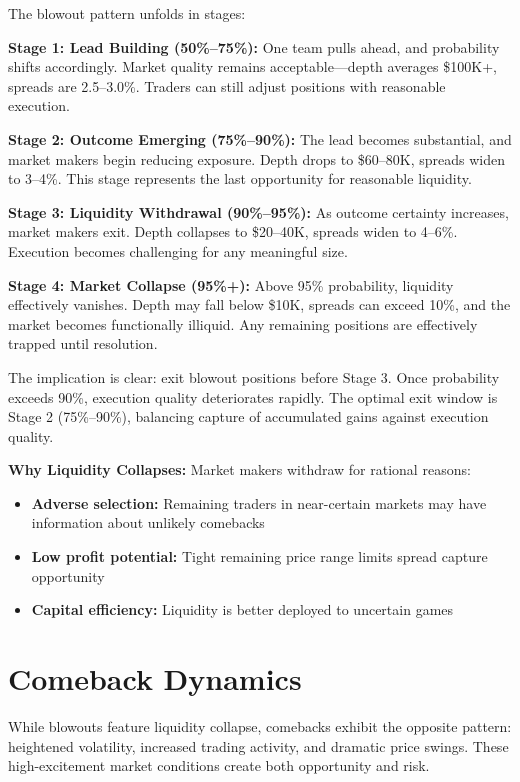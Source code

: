 The blowout pattern unfolds in stages:

\textbf{Stage 1: Lead Building (50\%--75\%):} One team pulls ahead, and probability shifts accordingly. Market quality remains acceptable---depth averages \$100K+, spreads are 2.5--3.0\%. Traders can still adjust positions with reasonable execution.

\textbf{Stage 2: Outcome Emerging (75\%--90\%):} The lead becomes substantial, and market makers begin reducing exposure. Depth drops to \$60--80K, spreads widen to 3--4\%. This stage represents the last opportunity for reasonable liquidity.

\textbf{Stage 3: Liquidity Withdrawal (90\%--95\%):} As outcome certainty increases, market makers exit. Depth collapses to \$20--40K, spreads widen to 4--6\%. Execution becomes challenging for any meaningful size.

\textbf{Stage 4: Market Collapse (95\%+):} Above 95\% probability, liquidity effectively vanishes. Depth may fall below \$10K, spreads can exceed 10\%, and the market becomes functionally illiquid. Any remaining positions are effectively trapped until resolution.

The implication is clear: exit blowout positions before Stage 3. Once probability exceeds 90\%, execution quality deteriorates rapidly. The optimal exit window is Stage 2 (75\%--90\%), balancing capture of accumulated gains against execution quality.

\textbf{Why Liquidity Collapses:} Market makers withdraw for rational reasons:
\begin{itemize}
    \item \textbf{Adverse selection:} Remaining traders in near-certain markets may have information about unlikely comebacks
    \item \textbf{Low profit potential:} Tight remaining price range limits spread capture opportunity
    \item \textbf{Capital efficiency:} Liquidity is better deployed to uncertain games
\end{itemize}

\section{Comeback Dynamics}

While blowouts feature liquidity collapse, comebacks exhibit the opposite pattern: heightened volatility, increased trading activity, and dramatic price swings. These high-excitement market conditions create both opportunity and risk.

